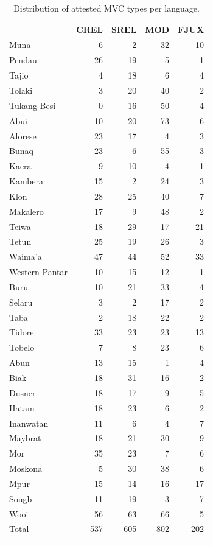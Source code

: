 \begin{table}
\begin{footnotesize}
\begin{tabular}{lrrrr}
  \lsptoprule
 & CREL & SREL & MOD & FJUX \\ 
  \hline
  Muna &   6 &   2 &  32  &   10  \\ 
  Pendau &  26 &  19 &   5  &   1  \\ 
  Tajio &   4 &  18 &   6  &   4  \\ 
  Tolaki &   3 &  20 &  40  &   2  \\ 
  Tukang Besi &   0 &  16 &  50   &   4 \\ \hline 
  Abui &  10 &  20 &  73  &   6  \\ 
  Alorese &  23 &  17 &   4  &   3  \\ 
  Bunaq &  23 &   6 &  55  &   3  \\ 
  Kaera &  9 &   10 &  4  &   1  \\ 
  Kambera &  15 &   2 &  24  &   3  \\ 
  Klon &  28 &  25 &  40  &   7  \\ 
  Makalero &  17 &   9 &  48  &   2  \\ 
  Teiwa &   18 &  29 &  17  &   21  \\ 
  Tetun &  25 &  19 &  26  &   3  \\ 
  Waima'a &  47 &  44 &  52  &  33  \\ 
  Western Pantar &  10 &  15 &  12  &   1  \\ \hline
  Buru & 10 & 21 & 33 & 4 \\
  Selaru &   3 &   2 &   17  &   2  \\ 
  Taba &   2 &  18 &  22  &   2  \\ 
  Tidore & 33 & 23 & 23 & 13 \\
  Tobelo &   7 &   8 &  23  &   6  \\ \hline
  Abun &  13 &  15 &   1  &   4  \\ 
  Biak &  18 &  31 &  16  &   2  \\ 
  Dusner &  18 &  17 &   9  &  5 \\ 
  Hatam &  18 &  23 &   6  &   2  \\ 
  Inanwatan &  11 &   6 &   4  &   7  \\ 
  Maybrat &  18 &  21 &  30  &   9  \\ 
  Mor &  35 &  23 &   7  &   6  \\ 
  Moskona &   5 &  30 &  38  &   6  \\ 
  Mpur &  15 &  14 &  16  &  17  \\ 
  Sougb &   11 &  19 &   3  &   7 \\ 
  Wooi &  56 &  63 &  66  &   5  \\ 
   \hline
   Total & 537 & 605 & 802 & 202 \\
   \lspbottomrule
\end{tabular}
\end{footnotesize}
\caption[Distribution of attested MVC types per language]{Distribution of attested MVC types per language.}
\label{table:MVCperlang}
\end{table}

